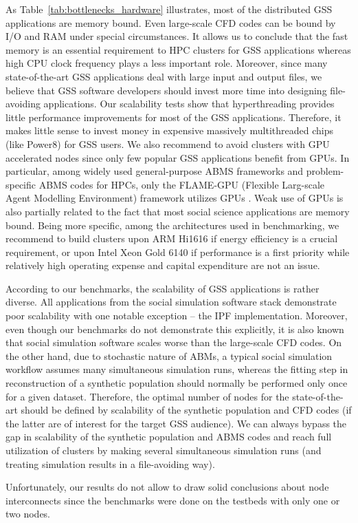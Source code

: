 As Table~\ref{tab:bottlenecks_hardware} illustrates, most of the distributed GSS applications are memory bound.
Even large-scale CFD codes can be bound by I/O and RAM under special circumstances.
It allows us to  conclude  that  the  fast  memory  is  an  essential  requirement  to  HPC  clusters  for  GSS applications
whereas high CPU clock frequency plays a less important role.
Moreover, since many state-of-the-art GSS applications deal with large input and output files,
we believe that GSS  software  developers  should  invest  more  time  into  designing  file-avoiding  applications.
Our scalability tests show that hyperthreading provides little performance improvements for most  of  the  GSS  applications.
Therefore,  it  makes  little  sense  to  invest  money  in  expensive massively  multithreaded  chips  (like  Power8)  for  GSS  users.
We  also  recommend  to avoid clusters  with  GPU  accelerated  nodes
since  only  few  popular  GSS  applications  benefit  from GPUs.
In  particular,  among  widely  used  general-purpose  ABMS  frameworks  and  problem-specific  ABMS  codes  for  HPCs,
only the FLAME-GPU  (Flexible Larg-scale Agent Modelling Environment) framework  utilizes  GPUs \cite{2011:flame_gpu,2018:flame_gpu}.
Weak  use of GPUs  is  also  partially  related  to  the  fact
that  most  social  science  applications  are  memory bound.
Being more specific, among the architectures used in benchmarking,
we recommend to build clusters upon ARM Hi1616 if energy efficiency is a crucial requirement,
or upon Intel Xeon Gold 6140 if performance is a first priority while relatively high operating expense and capital expenditure are not an issue.

According  to  our  benchmarks,  the  scalability  of  GSS  applications  is  rather  diverse.
All applications from the social simulation software stack demonstrate poor scalability with one notable exception -- the IPF implementation.
Moreover, even though our benchmarks do not demonstrate this explicitly,
it is also known that social simulation software scales worse than the large-scale CFD  codes.
On  the  other  hand,  due  to  stochastic  nature  of  ABMs,
a typical social simulation workflow assumes many simultaneous simulation runs,
whereas the fitting step in reconstruction of a synthetic population should normally be performed only once for a  given  dataset.
Therefore,  the  optimal  number  of  nodes  for  the  state-of-the-art  should  be defined by scalability of the synthetic population and CFD codes
(if the latter are of interest for  the  target  GSS  audience).
We  can  always  bypass  the  gap  in  scalability  of  the  synthetic population   and   ABMS   codes
and   reach   full   utilization   of   clusters   by   making   several simultaneous   simulation   runs
(and   treating   simulation   results   in   a   file-avoiding   way).

Unfortunately, our results do not allow to draw solid conclusions about node interconnects
since the benchmarks were done on the testbeds with only one or two nodes.
